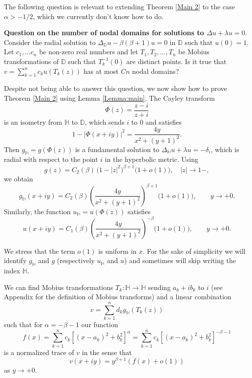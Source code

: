 \documentclass{article}
\begin{document}
The following question is relevant to extending Theorem \ref{Main 2} to the  case $\alpha>-1/2$, which we currently don't know how to do.

\textbf{Question on the number of nodal domains for solutions to $\Delta u+\lambda u =0$}. 
Consider the radial solution to $\Delta_\mathbb{D} u-\beta(\beta+1)u = 0$ in $\mathbb{D}$ such that $u(0)=1$. Let $c_1, \dots c_n$ be non-zero real numbers and let $T_1,T_2,\dots, T_n$ be Mobius transformations of $\mathbb{D}$ such that $T_k^{-1}(0)$ are distinct points. Is it true that $v=\sum_{k=1}^{n} c_ku(T_k(z))$ has at most $Cn$ nodal domains?

Despite not being able to answer this question, we now show how to prove Theorem \ref{Main 2}  using 
Lemma \ref{Lemma:main}.
The Cayley transform
\[
\Phi(z) = \frac{z-i}{z+i}
\]
 is an isometry from $\mathbb{H}$ to $\mathbb{D}$, which sends $i$ to $0$ and satisfies
\[
1 - \bigl|\Phi(x+iy)\bigr|^2 = \frac{4y}{x^2 + (y+1)^2}.
\]
Then $g_\mathbb{H}=g(\Phi(z))$ is a fundamental solution to 
$\Delta_\mathbb{H}u+\lambda u = -\delta_{i}$, which is radial with respect to the point $i$ in the hyperbolic metric.
Using
\[
g(z) = C_2(\beta)\,\bigl(1 - |z|^2\bigr)^{\beta+1}\bigl(1+o(1)\bigr),
\quad |z|\to 1-,
\]
we obtain
\begin{equation} \label{eq: asymptotics on half-plane}
g_\mathbb{H}(x+iy)
= C_2(\beta)\left(\frac{4y}{x^2 + (y+1)^2}\right)^{\beta+1}\bigl(1+o(1)\bigr),
\qquad y\to +0.
\end{equation}
Similarly, the function $u_{\mathbb{H}}=u(\Phi(z))$
satisfies 
\begin{equation} 
u(x+iy)
= C_1(\beta)\left(\frac{4y}{x^2 + (y+1)^2}\right)^{-\beta}\bigl(1+o(1)\bigr),
\qquad y\to +0.
\end{equation}

We stress that the term $o(1)$ is uniform in $x$. For the sake of simplicity we will identify $g_\mathbb{H}$ and $g$ (respectively $u_\mathbb{H}$ and $u$) and sometimes will skip writing the index $\mathbb{H}$.


We can find Mobius transformations $T_k:\mathbb{H} \to \mathbb{H}$ sending $a_k+ib_k$ to $i$ (see Appendix for the definition of Mobius transforms) and
a linear combination $$v=\sum _{k=1}^{n}d_k g_\mathbb{H}(T_k(z))$$
 such that for $\alpha=-\beta-1$ our function
\[
f(x)=\sum_{k=1}^{n}c_{k}[(x-a_{k})^{2}+b_{k}^{2}]^{\alpha}= \sum_{k=1}^{n}c_{k}[(x-a_{k})^{2}+b_{k}^{2}]^{-\beta-1}
\]
is a normalized trace of $v$ in the sense that 
$$ v(x+iy)= y^{\beta+1}(f(x)+o(1))$$
as $y\to+0$. 
\end{document}
